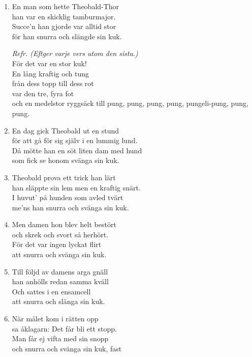 \documentclass[twoside, openright]{report}
\begin{document}
\begin{enumerate}
\item En man som hette Theobald-Thor\\
han var en skicklig tamburmajor.\\
Succe'n han gjorde var alltid stor\\
för han snurra och slängde sin kuk.

\textit{Refr. (Eftger varje vers utom den sista.)}\\
För det var en stor kuk!\\
En lång kraftig och tung\\
från dess topp till dess rot\\
var den tre, fyra fot\\
och en medelstor ryggsäck till pung, pung, pung, pung, pungeli-pung, pung, pung.\\

\item En dag gick Theobald ut en stund\\
för att gå för sig själv i en lummig lund.\\
Då mötte han en söt liten dam med hund\\
som fick se honom svänga sin kuk.

\item Theobald prova ett trick han lärt\\
han släppte sin lem men en kraftig snärt.\\
I huvut' på hunden som avled tvärt\\
me'ns han snurra och svänga sin kuk.

\item Men damen hon blev helt bestört\\
och skrek och svort så herhört.\\
För det var ingen lyckat flirt\\
att snurra och svänga sin kuk.

\item Till följd av damens arga gnäll\\
han anhölls redan samma kväll\\
Och sattes i en ensamcell\\
att snurra och slänga sin kuk.

\item När målet kom i rätten opp\\
sa åklagarn: Det får bli ett stopp.\\
Man får ej vifta med sin snopp\\
och snurra och svänga sin kuk, fast


\end{enumerate}
\end{document}
